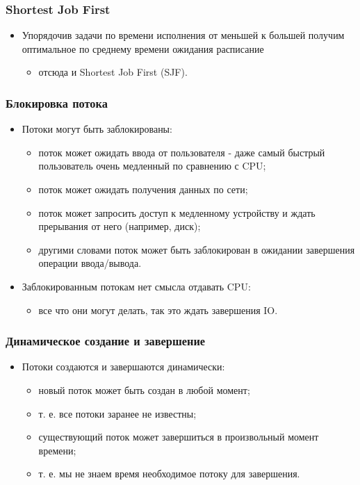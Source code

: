 \begin{frame}
\frametitle{Shortest Job First}
\begin{itemize}
  \item Упорядочив задачи по времени исполнения от меньшей к большей получим
  оптимальное по среднему времени ожидания расписание
  \begin{itemize}
    \item отсюда и Shortest Job First (SJF).
  \end{itemize}
\end{itemize}
\end{frame}

\begin{frame}
\frametitle{Блокировка потока}
\begin{itemize}
  \item Потоки могут быть заблокированы:
  \begin{itemize}
    \item поток может ожидать ввода от пользователя - даже самый быстрый
    пользователь очень медленный по сравнению с CPU;
    \item поток может ожидать получения данных по сети;
    \item поток может запросить доступ к медленному устройству и ждать
    прерывания от него (например, диск);
    \item другими словами поток может быть заблокирован в ожидании завершения
    операции ввода/вывода.
  \end{itemize}
  \item Заблокированным потокам нет смысла отдавать CPU:
  \begin{itemize}
    \item все что они могут делать, так это ждать завершения IO.
  \end{itemize}
\end{itemize}
\end{frame}

\begin{frame}
\frametitle{Динамическое создание и завершение}
\begin{itemize}
  \item Потоки создаются и завершаются динамически:
  \begin{itemize}
    \item новый поток может быть создан в любой момент;
    \item т. е. все потоки заранее не известны;
    \item существующий поток может завершиться в произвольный момент времени;
    \item т. е. мы не знаем время необходимое потоку для завершения.
  \end{itemize}
\end{itemize}
\end{frame}

